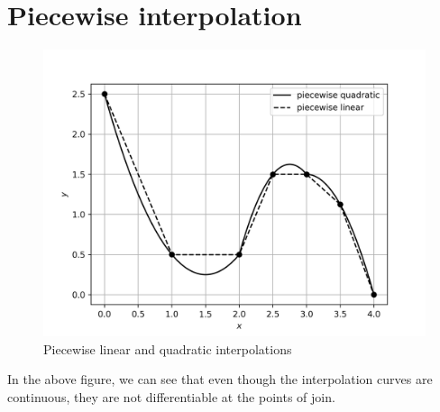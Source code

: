 \documentclass[12,a4paper]{article}
\begin{document}
    \section{Piecewise interpolation}
    \begin{figure}[H]
        \centering
        \includegraphics[width=\textwidth]{plots/q5c.png}
        \caption{Piecewise linear and quadratic interpolations }
        \label{fig:q5c}
    \end{figure}
    In the above figure, we can see that even though the interpolation curves are continuous, they are not differentiable at the points of join.
\end{document}
